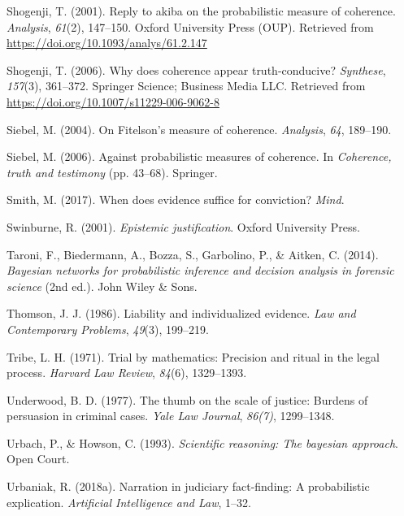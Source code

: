 \documentclass[11pt,dvipsnames,enabledeprecatedfontcommands]{scrartcl}
\begin{document}
\leavevmode\hypertarget{ref-Shogenji2001Reply}{}%
Shogenji, T. (2001). Reply to akiba on the probabilistic measure of
coherence. \emph{Analysis}, \emph{61}(2), 147--150. Oxford University
Press (OUP). Retrieved from
\url{https://doi.org/10.1093/analys/61.2.147}

\leavevmode\hypertarget{ref-Shogenji2006Why}{}%
Shogenji, T. (2006). Why does coherence appear truth-conducive?
\emph{Synthese}, \emph{157}(3), 361--372. Springer Science; Business
Media LLC. Retrieved from
\url{https://doi.org/10.1007/s11229-006-9062-8}

\leavevmode\hypertarget{ref-Siebel2004On-Fitelsons-me}{}%
Siebel, M. (2004). On Fitelson's measure of coherence. \emph{Analysis},
\emph{64}, 189--190.

\leavevmode\hypertarget{ref-siebel2006against}{}%
Siebel, M. (2006). Against probabilistic measures of coherence. In
\emph{Coherence, truth and testimony} (pp. 43--68). Springer.

\leavevmode\hypertarget{ref-Smith_conviction_mind_2017}{}%
Smith, M. (2017). When does evidence suffice for conviction?
\emph{Mind}.

\leavevmode\hypertarget{ref-Swinburne2001-SWIEJ}{}%
Swinburne, R. (2001). \emph{Epistemic justification}. Oxford University
Press.

\leavevmode\hypertarget{ref-taroni2006bayesian}{}%
Taroni, F., Biedermann, A., Bozza, S., Garbolino, P., \& Aitken, C.
(2014). \emph{Bayesian networks for probabilistic inference and decision
analysis in forensic science} (2nd ed.). John Wiley \& Sons.

\leavevmode\hypertarget{ref-Thomson86}{}%
Thomson, J. J. (1986). Liability and individualized evidence. \emph{Law
and Contemporary Problems}, \emph{49}(3), 199--219.

\leavevmode\hypertarget{ref-tribe71}{}%
Tribe, L. H. (1971). Trial by mathematics: Precision and ritual in the
legal process. \emph{Harvard Law Review}, \emph{84}(6), 1329--1393.

\leavevmode\hypertarget{ref-Underwood1977The-thumb-on-th}{}%
Underwood, B. D. (1977). The thumb on the scale of justice: Burdens of
persuasion in criminal cases. \emph{Yale Law Journal}, \emph{86(7)},
1299--1348.

\leavevmode\hypertarget{ref-Urbach1993-HOWSRT}{}%
Urbach, P., \& Howson, C. (1993). \emph{Scientific reasoning: The
bayesian approach}. Open Court.

\leavevmode\hypertarget{ref-urbaniak2018narration}{}%
Urbaniak, R. (2018a). Narration in judiciary fact-finding: A
probabilistic explication. \emph{Artificial Intelligence and Law},
1--32.
\end{document}
